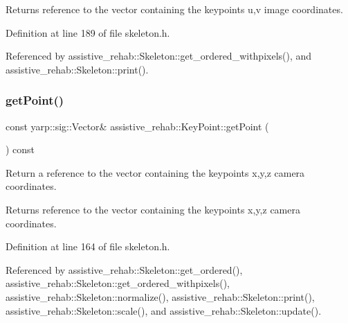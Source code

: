 \begin{DoxyReturn}{Returns}
reference to the vector containing the keypoint\textquotesingle{}s u,v image coordinates. 
\end{DoxyReturn}


Definition at line 189 of file skeleton.\+h.


\begin{DoxyCode}{0}

\end{DoxyCode}


Referenced by assistive\+\_\+rehab\+::\+Skeleton\+::get\+\_\+ordered\+\_\+withpixels(), and assistive\+\_\+rehab\+::\+Skeleton\+::print().

\mbox{\label{classassistive__rehab_1_1KeyPoint_a4d68e0824d66f6f0db6dbc176eec3930}} 
\subsubsection{\texorpdfstring{getPoint()}{getPoint()}}
{\footnotesize\ttfamily const yarp\+::sig\+::\+Vector\& assistive\+\_\+rehab\+::\+Key\+Point\+::get\+Point (\begin{DoxyParamCaption}{ }\end{DoxyParamCaption}) const\hspace{0.3cm}{\ttfamily [inline]}}



Return a reference to the vector containing the keypoint\textquotesingle{}s x,y,z camera coordinates. 

\begin{DoxyReturn}{Returns}
reference to the vector containing the keypoint\textquotesingle{}s x,y,z camera coordinates. 
\end{DoxyReturn}


Definition at line 164 of file skeleton.\+h.


\begin{DoxyCode}{0}

\end{DoxyCode}


Referenced by assistive\+\_\+rehab\+::\+Skeleton\+::get\+\_\+ordered(), assistive\+\_\+rehab\+::\+Skeleton\+::get\+\_\+ordered\+\_\+withpixels(), assistive\+\_\+rehab\+::\+Skeleton\+::normalize(), assistive\+\_\+rehab\+::\+Skeleton\+::print(), assistive\+\_\+rehab\+::\+Skeleton\+::scale(), and assistive\+\_\+rehab\+::\+Skeleton\+::update().

